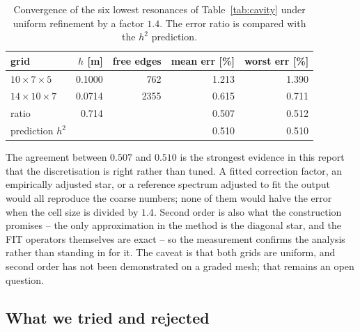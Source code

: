 \begin{table}[H]
  \centering
  \caption{Convergence of the six lowest resonances of Table~\ref{tab:cavity} under uniform
refinement by a
  factor $1.4$. The error ratio is compared with the $h^{2}$ prediction.}
  \label{tab:convergence}
  \begin{tabular}{@{}lrrrr@{}}
    \toprule
    grid & $h$ [m] & free edges & mean err [\%] & worst err [\%] \\
    \midrule
    $10\times7\times5$   & 0.1000 & 762  & 1.213 & 1.390 \\
    $14\times10\times7$  & 0.0714 & 2355 & 0.615 & 0.711 \\
    \midrule
    ratio                & 0.714  &      & 0.507 & 0.512 \\
    prediction $h^{2}$   &        &      & 0.510 & 0.510 \\
    \bottomrule
  \end{tabular}
\end{table}

The agreement between $0.507$ and $0.510$ is the strongest evidence in this report that the
discretisation is right rather than tuned. A fitted correction factor, an empirically adjusted star,
or a reference spectrum adjusted to fit the output would all reproduce the coarse numbers; none of
them would halve the error when the cell size is divided by $1.4$. Second order is also what the
construction promises -- the only approximation in the method is the diagonal star, and the FIT
operators themselves are exact \cite{weiland1977,clemens2001} -- so the measurement confirms the
analysis rather than standing in for it. The caveat is that both grids are uniform, and second order
has not been demonstrated on a graded mesh; that remains an open question.

\subsection{What we tried and rejected} \label{sec:rejected}

